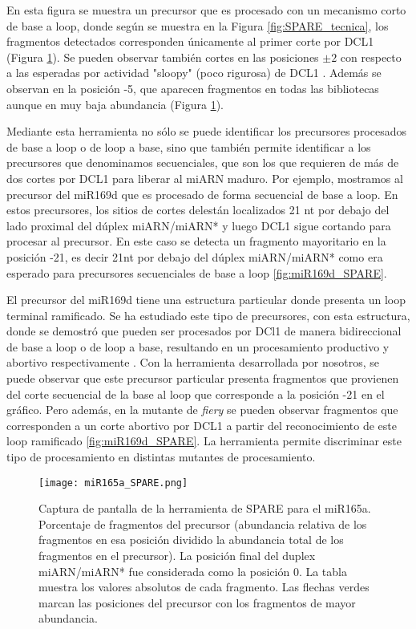 En esta figura se muestra un precursor que es procesado con un mecanismo corto de base a loop, donde según se muestra en la Figura \ref{fig:SPARE_tecnica}, los fragmentos detectados corresponden únicamente al primer corte por DCL1 (Figura \ref{fig:miR165a_SPARE}).
Se pueden observar también cortes en las posiciones $\pm 2$ con respecto a las esperadas por actividad "sloopy" (poco rigurosa) de DCL1 \citep{pmid17989254}.
Además se observan en la posición -5, que aparecen fragmentos en todas las bibliotecas aunque en muy baja abundancia (Figura \ref{fig:miR165a_SPARE}).

Mediante esta herramienta no sólo se puede identificar los precursores procesados de base a loop o de loop a base, sino que también permite identificar a los precursores que denominamos secuenciales, que son los que requieren de más de dos cortes por DCL1 para liberar al miARN maduro.
Por ejemplo, mostramos al precursor del miR169d que es procesado de forma secuencial de base a loop.
En estos precursores, los sitios de cortes delestán localizados 21 nt por debajo del lado proximal del dúplex miARN/miARN* y luego DCL1 sigue cortando para procesar al precursor.
En este caso se detecta un fragmento mayoritario en la posición -21, es decir 21nt por debajo del dúplex miARN/miARN* como era esperado para precursores secuenciales de base a loop \ref{fig:miR169d_SPARE}.

El precursor del miR169d tiene una estructura particular donde presenta un loop terminal ramificado.
Se ha estudiado este tipo de precursores, con esta estructura, donde se demostró que pueden ser procesados por DCl1 de manera bidireccional de base a loop o de loop a base, resultando en un procesamiento productivo y abortivo respectivamente \citep{pmid23934148}.
Con la herramienta desarrollada por nosotros, se puede observar que este precursor particular presenta fragmentos que provienen del corte secuencial de la base al loop que corresponde a la posición -21 en el gráfico.
Pero además, en la mutante de \textit{fiery} se pueden observar fragmentos que corresponden a un corte abortivo por DCL1 a partir del reconocimiento de este loop ramificado \ref{fig:miR169d_SPARE}.
La herramienta permite discriminar este tipo de procesamiento en distintas mutantes de procesamiento. 

\begin{landscape}
    \begin{figure}[htbp!] 
        \centering    
        \texttt{[image: miR165a\_SPARE.png]}
        \caption[Captura de pantalla de la herramienta de SPARE para el miR165a]{Captura de pantalla de la herramienta de SPARE para el miR165a.
        Porcentaje de fragmentos del precursor (abundancia relativa de los fragmentos en esa posición dividido la abundancia total de los fragmentos en el precursor).
        La posición final del duplex miARN/miARN* fue considerada como la posición 0.
        La tabla muestra los valores absolutos de cada fragmento.
        Las flechas verdes marcan las posiciones del precursor con los fragmentos de mayor abundancia. 
        }
         \label{fig:miR165a_SPARE}
    \end{figure}
\end{landscape}

